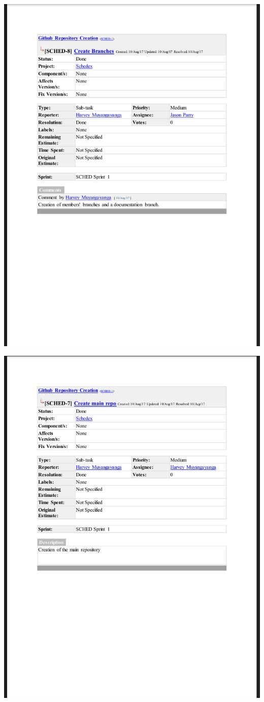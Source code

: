 \documentclass{article}
\begin{document}
\centerline{\includegraphics[scale=0.4]{sprint1_4}}

\centerline{\includegraphics[scale=0.4]{sprint1_5}}
\end{document}
